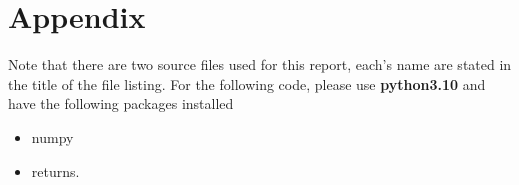 \documentclass[a4paper,12pt]{article}
\begin{document}
\section{Appendix}
Note that there are two source files used for this report,
each's name are stated in the title of the file listing.
For the following code, please use \textbf{python3.10} and have the following packages installed
\begin{itemize}
	\item numpy
	\item returns.
\end{itemize}



\end{document}
